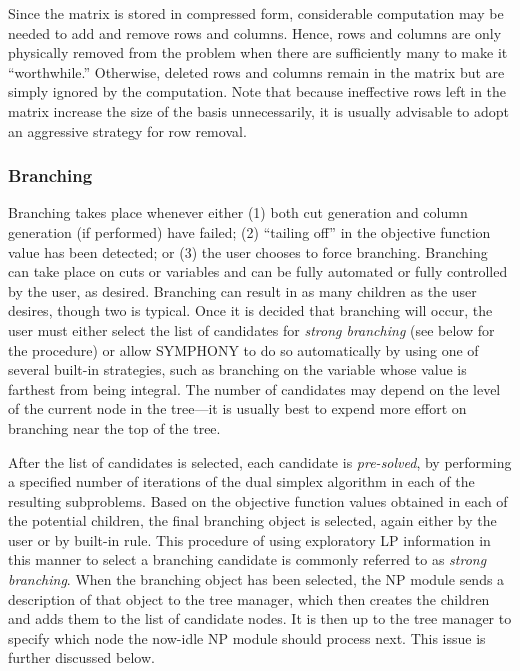 Since the matrix is stored in compressed form, considerable
computation may be needed to add and remove rows and columns. Hence,
rows and columns are only physically removed from the problem when
there are sufficiently many to make it ``worthwhile.'' Otherwise,
deleted rows and columns remain in the matrix but are simply ignored
by the computation. Note that because ineffective rows left in the
matrix increase the size of the basis unnecessarily, it is usually
advisable to adopt an aggressive strategy for row removal.

\subsubsection{Branching}
\label{branching}

Branching takes place whenever either (1) both cut generation and
column generation (if performed) have failed; (2) ``tailing off'' in
the objective function value has been detected; or (3) the
user chooses to force branching. Branching can take place on cuts or
variables and can be fully automated or fully controlled by the user,
as desired. Branching can result in as many children as the user
desires, though two is typical. Once it is decided that branching will
occur, the user must either select the list of candidates for {\em
strong branching} (see below for the procedure) or allow SYMPHONY to
do so automatically by using one of several built-in strategies, such
as branching on the variable whose value is farthest from being
integral. The number of candidates may depend on the level of the
current node in the tree---it is usually best to expend more effort on
branching near the top of the tree.

After the list of candidates is selected, each candidate is {\em
pre-solved}, by performing a specified number of iterations of the
dual simplex algorithm in each of the resulting subproblems. Based on
the objective function values obtained in each of the potential
children, the final branching object is selected, again either by the
user or by built-in rule. This procedure of using exploratory LP
information in this manner to select a branching candidate is commonly
referred to as {\em strong branching}. When the branching object has
been selected, the NP module sends a description of that object to the
tree manager, which then creates the children and adds them to the
list of candidate nodes. It is then up to the tree manager to specify
which node the now-idle NP module should process next. This issue is
further discussed below.

